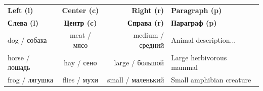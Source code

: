 \documentclass{article}
\begin{document}
\begin{tabular}{l c r p{3cm}}
\toprule
\textbf{Left (l)} & \textbf{Center (c)} & \textbf{Right (r)} & \textbf{Paragraph (p)} \\
\textbf{Слева (l)} & \textbf{Центр (c)} & \textbf{Справа (r)} & \textbf{Параграф (p)} \\
\midrule
dog / собака & meat / мясо & medium / средний & Animal description... \\
horse / лошадь & hay / сено & large / большой & Large herbivorous mammal \\
frog / лягушка & flies / мухи & small / маленький & Small amphibian creature \\
\bottomrule
\end{tabular}
\end{document}
